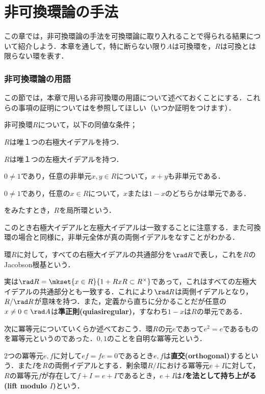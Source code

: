 \part[Methods of Non Commutative Algebras]{非可換環論の手法}
この章では，非可換環論の手法を可換環論に取り入れることで得られる結果について紹介しよう．本章を通して，特に断らない限り$A$は可換環を，$R$は可換とは限らない環を表す．

\section{非可換環論の用語}

この節では，本章で用いる非可換環の用語について述べておくことにする．これらの事項の証明については\cite{Hazewinkel2005}を参照してほしい（いつか証明をつけます）．
\begin{defi}[局所環]
	非可換環$R$について，以下の同値な条件；
	\begin{sakura}
		\item $R$は唯１つの右極大イデアルを持つ．
		\item $R$は唯１つの左極大イデアルを持つ．
		\item $0\neq 1$であり，任意の非単元$x,y\in  R$について，$x+y$も非単元である．
		\item $0\neq 1$であり，任意の$x\in  R$について，$x$または$1-x$のどちらかは単元である．
	\end{sakura}
	をみたすとき，$R$を局所環という．
\end{defi}
このとき右極大イデアルと左極大イデアルは一致することに注意する．また可換環の場合と同様に，非単元全体が真の両側イデアルをなすことがわかる．

\begin{defi}[Jacobson根基]
	環$R$に対して，すべての右極大イデアルの共通部分を$\rad R$で表し，これを$R$のJacobson根基という．
\end{defi}

実は$\rad R=\mkset{x\in R}{1+RxR\subset R^\times}$であって，これはすべての左極大イデアルの共通部分とも一致する．これにより$\rad R$は両側イデアルとなり，$R/\rad R$が意味を持つ．また，定義から直ちに分かることだが任意の$x\neq0\in\rad A$は\textbf{準正則(quiasiregular)}，すなわち$1-x$は$R$の単元である．

次に冪等元についていくらか述べておこう．環$R$の元$e$であって$e^2=e$であるものを冪等元というのであった．$0,1$のことを自明な冪等元という．

\begin{defi}
2つの冪等元$e,f$に対して$ef=fe=0$であるとき$e,f$は\textbf{直交(orthogonal)}するという．また$I$を$R$の両側イデアルとする．剰余環$R/I$における冪等元$e+I$に対して，$R$の冪等元$f$が存在して$f+I=e+I$であるとき，$e+I$は\textbf{$I$を法として持ち上がる(lift modulo $I$)}という．
\end{defi}


